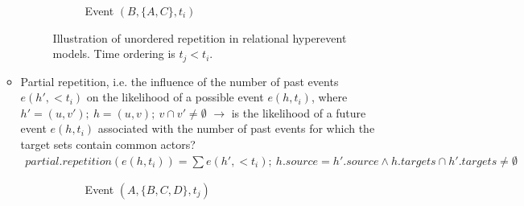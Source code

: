 \begin{itemize}
\begin{itemize}
\begin{figure}
\begin{mdframed}
\begin{subfigure}[t]{0.45\linewidth}
					\caption{Event $(B,\{A,C\},t_i)$}
				\end{subfigure}
				\caption{Illustration of unordered repetition in relational hyperevent models. Time ordering is $t_j < t_i$.}
				\label{fig:rhem_unordered_repetition}
			\end{mdframed}
		\end{figure}
	
		\item Partial repetition, i.e. the influence of the number of past events $e(h',<t_i)$ on the likelihood of a possible event $e(h,t_i)$, where $h' = (u,v'); \: h = (u,v); \: v \cap v' \neq \emptyset$ $\rightarrow$ is the likelihood of a future event $e(h,t_i)$ associated with the number of past events for which the target sets contain common actors? 
		\begin{align*}
			partial.repetition(e(h,t_i)) = \sum e(h',<t_i); \: h.source = h'.source \land h.targets \cap h'.targets \neq \emptyset
		\end{align*}
		\begin{figure}
			\begin{mdframed}
				\centering
				\begin{subfigure}[t]{0.45\linewidth}
					\vskip 0pt
					\caption{Event $(A,\{B,C,D\},t_j)$}
				\end{subfigure}
				\hfill
				\begin{subfigure}[t]{0.45\linewidth}
					\vskip 0pt
\end{subfigure}
\end{mdframed}
\end{figure}
\end{itemize}
\end{itemize}
